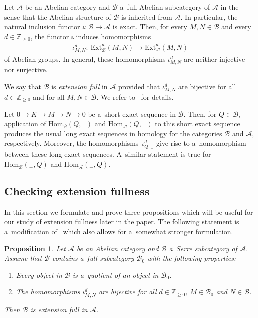 \documentclass[11pt]{article}
\newtheorem{proposition}{Proposition}
\begin{document}
Let $\mathcal{A}$ be an Abelian category and $\mathcal{B}$ a~full Abelian subcategory of $\mathcal{A}$ in the sense that
the Abelian structure of $\mathcal{B}$ is inherited from $\mathcal{A}$.
In particular, the natural inclusion functor $\boldsymbol{\iota}:\mathcal{B}\to \mathcal{A}$ is exact.
Then, for every $M,N\in\mathcal{B}$ and every $d\in\mathbb{Z}_{\geq0}$, the functor $\boldsymbol{\iota}$ induces
homomorphisms
\begin{gather*}
\iota^d_{M,N}: \ \mathrm{Ext}_{\mathcal{B}}^d(M,N)\to \mathrm{Ext}_{\mathcal{A}}^d(M,N)
\end{gather*}
of Abelian groups.
In general, these homomorphisms $\iota^d_{M,N}$ are neither injective nor surjective.

We say that $\mathcal{B}$ is {\em extension full} in $\mathcal{A}$ provided that $\iota^d_{M,N}$ are bijective for all
$d\in\mathbb{Z}_{\geq0}$ and for all $M,N\in\mathcal{B}$.
We refer to~\cite[Section~2]{CoMa} for details.

Let $0\to K\to M\to N\to 0$ be a~short exact sequence in $\mathcal{B}$.
Then, for $Q\in \mathcal{B}$, application of $\mathrm{Hom}_{\mathcal{B}}(Q,{}_-)$ and
$\mathrm{Hom}_{\mathcal{A}}(Q,{}_-)$ to this short exact sequence produces the usual long exact sequences in homology
for the categories $\mathcal{B}$ and $\mathcal{A}$, respectively.
Moreover, the homomor\-phisms~$\iota^d_{Q,{}_-}$ give rise to a~homomorphism between these long exact sequences.
A~similar statement is true for $\mathrm{Hom}_{\mathcal{B}}({}_-,Q)$ and $\mathrm{Hom}_{\mathcal{A}}({}_-,Q)$.

\subsection{Checking extension fullness}%

In this section we formulate and prove three propositions which will be useful for our study of extension fullness later
in the paper.
The following statement is a~modif\/ication of~\cite[Lemma~4]{CoMa} which also allows for a~somewhat stronger formulation.

\begin{proposition}
\label{prop1}
Let $\mathcal{A}$ be an Abelian category and $\mathcal{B}$ a~Serre subcategory of $\mathcal{A}$.
Assume that $\mathcal{B}$ contains a~full subcategory $\mathcal{B}_0$ with the following properties:
\begin{enumerate}[$($a$)$]\itemsep=0pt
\item
\label{prop1.1}
Every object in $\mathcal{B}$ is a~quotient of an object in $\mathcal{B}_0$.
\item
\label{prop1.2}
The homomorphisms $\iota^d_{M,N}$ are bijective for all $d\in\mathbb{Z}_{\geq0}$, $M\in\mathcal{B}_0$ and
$N\in\mathcal{B}$.
\end{enumerate}
Then $\mathcal{B}$ is {\em extension full} in $\mathcal{A}$.
\end{proposition}
\end{document}
